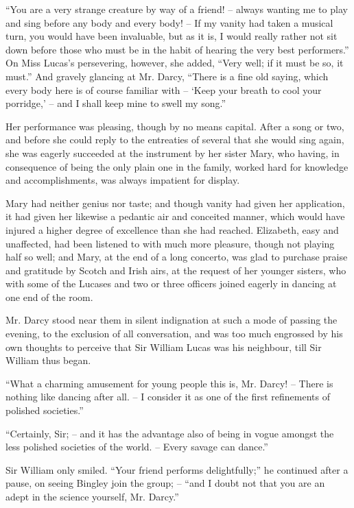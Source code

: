 “You are a very strange creature by way of a friend! -- always
wanting me to play and sing before any body and
every body! -- If my vanity had taken a musical turn,
you would have been invaluable, but as it is, I would
really rather not sit down before those who must be in
the habit of hearing the very best performers.” On Miss
Lucas’s persevering, however, she added, “Very well;
if it must be so, it must.” And gravely glancing at
Mr. Darcy, “There is a fine old saying, which every body
here is of course familiar with -- ‘Keep your breath to cool
your porridge,’ -- and I shall keep mine to swell my
song.”

Her performance was pleasing, though by no means
capital. After a song or two, and before she could reply
to the entreaties of several that she would sing again, she
was eagerly succeeded at the instrument by her sister
Mary, who having, in consequence of being the only plain
one in the family, worked hard for knowledge and accomplishments,
was always impatient for display.

Mary had neither genius nor taste; and though vanity
had given her application, it had given her likewise a
pedantic air and conceited manner, which would have
injured a higher degree of excellence than she had reached.
Elizabeth, easy and unaffected, had been listened to with
much more pleasure, though not playing half so well;
and Mary, at the end of a long concerto, was glad to purchase
praise and gratitude by Scotch and Irish airs, at
the request of her younger sisters, who with some of the
Lucases and two or three officers joined eagerly in dancing
at one end of the room.

Mr. Darcy stood near them in silent indignation at such
a mode of passing the evening, to the exclusion of all
conversation, and was too much engrossed by his own thoughts
to perceive that Sir William Lucas was his neighbour, till
Sir William thus began.

“What a charming amusement for young people this
is, Mr. Darcy! -- There is nothing like dancing after all. --
I consider it as one of the first refinements of polished
societies.”

“Certainly, Sir; -- and it has the advantage also of
being in vogue amongst the less polished societies of the
world. -- Every savage can dance.”

Sir William only smiled. “Your friend performs
delightfully;” he continued after a pause, on seeing
Bingley join the group; -- “and I doubt not that you are
an adept in the science yourself, Mr. Darcy.”


